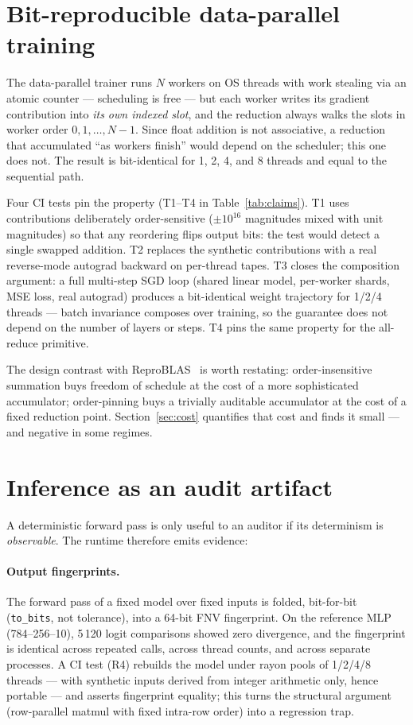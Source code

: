 \documentclass[sigconf,review]{acmart}
\begin{document}
\section{Bit-reproducible data-parallel training}
\label{sec:training}

The data-parallel trainer runs $N$ workers on OS threads with work stealing
via an atomic counter --- scheduling is free --- but each worker writes its
gradient contribution into \emph{its own indexed slot}, and the reduction
always walks the slots in worker order $0,1,\dots,N{-}1$. Since float
addition is not associative, a reduction that accumulated ``as workers
finish'' would depend on the scheduler; this one does not. The result is
bit-identical for 1, 2, 4, and 8 threads and equal to the sequential path.

Four CI tests pin the property (T1--T4 in Table~\ref{tab:claims}). T1 uses
contributions deliberately order-sensitive ($\pm 10^{16}$ magnitudes mixed
with unit magnitudes) so that any reordering flips output bits: the test
would detect a single swapped addition. T2 replaces the synthetic
contributions with a real reverse-mode autograd backward on per-thread
tapes. T3 closes the composition argument: a full multi-step SGD loop
(shared linear model, per-worker shards, MSE loss, real autograd) produces
a bit-identical weight trajectory for 1/2/4 threads --- batch invariance
composes over training, so the guarantee does not depend on the number of
layers or steps. T4 pins the same property for the all-reduce primitive.

The design contrast with ReproBLAS~\cite{demmel2013} is worth restating:
order-insensitive summation buys freedom of schedule at the cost of a more
sophisticated accumulator; order-pinning buys a trivially auditable
accumulator at the cost of a fixed reduction point. Section~\ref{sec:cost}
quantifies that cost and finds it small --- and negative in some regimes.

\section{Inference as an audit artifact}
\label{sec:inference}

A deterministic forward pass is only useful to an auditor if its
determinism is \emph{observable}. The runtime therefore emits evidence:

\paragraph{Output fingerprints.}
The forward pass of a fixed model over fixed inputs is folded, bit-for-bit
(\texttt{to\_bits}, not tolerance), into a 64-bit FNV fingerprint. On the
reference MLP (784--256--10), 5\,120 logit comparisons showed zero
divergence, and the fingerprint is identical across repeated calls, across
thread counts, and across separate processes. A CI test (R4) rebuilds the
model under rayon pools of 1/2/4/8 threads --- with synthetic inputs
derived from integer arithmetic only, hence portable --- and asserts
fingerprint equality; this turns the structural argument (row-parallel
matmul with fixed intra-row order) into a regression trap.
\end{document}
